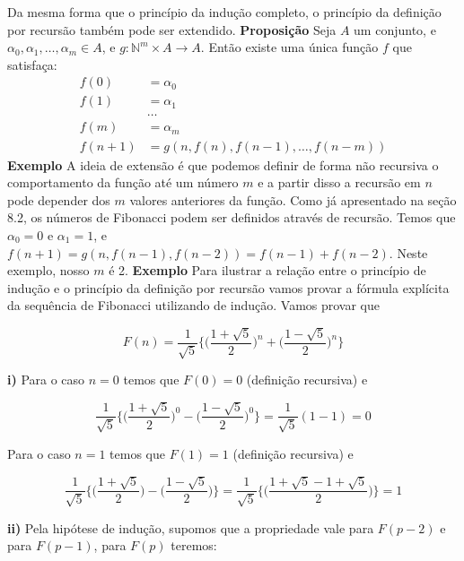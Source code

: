 Da mesma forma que o princípio da indução completo, o princípio da definição por recursão também pode ser
extendido.
\newline \textbf{Proposição} Seja $A$ um conjunto, e $\alpha_0, \alpha_1, \dots, \alpha_m \in A$,
e $g : \mathbb{N}^m \times A \to A$. Então existe uma única função $f$ que satisfaça:
\begin{align*}
     f(0) &= \alpha_0 \\
     f(1) &= \alpha_1 \\
     &\dots \\
     f(m) &= \alpha_m \\
     f(n+1) &= g(n, f(n), f(n-1), \dots, f(n-m))
\end{align*} 
\textbf{Exemplo} A ideia de extensão é que podemos definir de forma não recursiva o comportamento da
função até um número $m$ e a partir disso a recursão em $n$ pode depender dos $m$ valores anteriores da 
função. Como já apresentado na seção 8.2, os números de Fibonacci podem ser definidos através de 
recursão. Temos que $\alpha_0 = 0$ e $\alpha_1 = 1$, e $f(n+1) = g(n, f(n-1), f(n-2)) = f(n-1) + f(n-2)$. 
Neste exemplo, nosso $m$ é 2.
\newline \textbf{Exemplo} Para ilustrar a relação entre o princípio de indução e o princípio da definição por recursão
vamos provar a fórmula explícita da sequência de Fibonacci utilizando de indução. Vamos provar que
\begin{center}   
\[ F(n) = \frac{1}{\sqrt{5}}\bigg \{ \Big (\frac{1+\sqrt{5}}{2} \Big )^n + \Big (\frac{1-\sqrt{5}}{2}\Big )^n\bigg \}\]
\end{center}
\textbf{i)} Para o caso $n=0$ temos que $F(0) = 0$ (definição recursiva) e
\begin{center}
    \[ \frac{1}{\sqrt{5}}\bigg \{ \Big(\frac{1+\sqrt{5}}{2}\Big)^0 - \Big(\frac{1-\sqrt{5}}{2}\Big)^0 \bigg \} = \frac{1}{\sqrt{5}}(1 - 1) = 0 \]
\end{center}
Para o caso $n=1$ temos que $F(1) = 1$ (definição recursiva) e
\begin{center}
    \[ \frac{1}{\sqrt{5}} \bigg \{ \Big(\frac{1+\sqrt{5}}{2} \Big) - \Big(\frac{1 -\sqrt{5}}{2} \Big)\bigg \} =\frac{1}{\sqrt{5}} \bigg \{ \Big(\frac{1+\sqrt{5} - 1 + \sqrt{5}}{2} \Big)\bigg \} = 1\]
\end{center}
\textbf{ii)} Pela hipótese de indução, supomos que a propriedade vale para $F(p-2)$ e para $F(p-1)$,
para $F(p)$ teremos:
